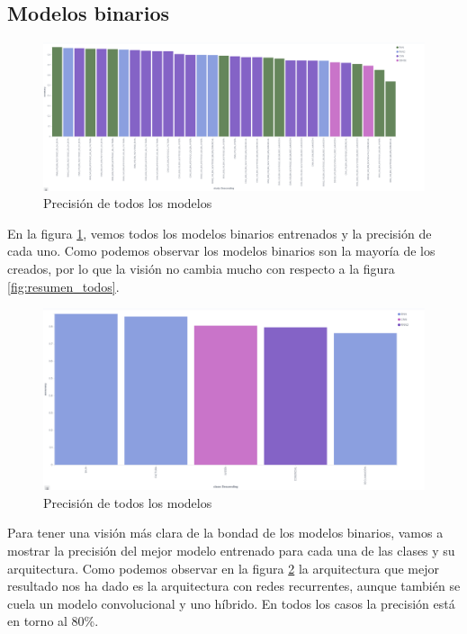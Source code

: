  
\subsection{Modelos binarios}


\begin{figure}[!ht]
	\centering
	\includegraphics[width=1\textwidth]{images/super/resumen_bin}
	\caption{Precisión de todos los modelos}
	\label{fig:resumen_bin}
\end{figure}

En la figura \ref{fig:resumen_bin}, vemos todos los modelos binarios entrenados y la precisión de cada uno. Como podemos observar los modelos binarios son la mayoría de los creados, por lo que la visión no cambia mucho con respecto a la figura \ref{fig:resumen_todos}.

\begin{figure}[!ht]
	\centering
	\includegraphics[width=1\textwidth]{images/super/resumen_bestbin}
	\caption{Precisión de todos los modelos}
	\label{fig:resumen_bestbin}
\end{figure}

Para tener una visión más clara de la bondad de los modelos binarios, vamos a mostrar la precisión del mejor modelo entrenado para cada una de las clases y su arquitectura. Como podemos observar en la figura \ref{fig:resumen_bestbin} la arquitectura que mejor resultado nos ha dado es la arquitectura con redes recurrentes, aunque también se cuela un modelo convolucional y uno híbrido. En todos los casos la precisión está en torno al 80\%.

